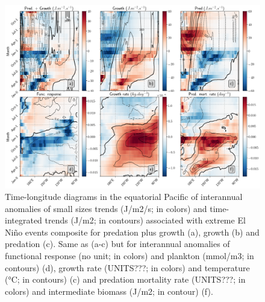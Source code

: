 \begin{figure}[h!tp]
	\centering
	\includegraphics[scale=0.4]{figs/fig8.png}	
	\caption{Time-longitude diagrams in the equatorial Pacific of interannual anomalies of small sizes trends (J/m2/s; in colors) and time-integrated trends (J/m2; in contours) associated with extreme El Niño events composite for predation plus growth (a), growth (b) and predation (c). Same as (a-c) but for interannual anomalies of functional response (no unit; in colors) and plankton (mmol/m3; in contours) (d), growth rate (UNITS???; in colors) and temperature (°C; in contours) (c) and predation mortality rate (UNITS???; in colors) and intermediate biomass (J/m2; in contour) (f).}
	\label{fig:fig8}
\end{figure}

